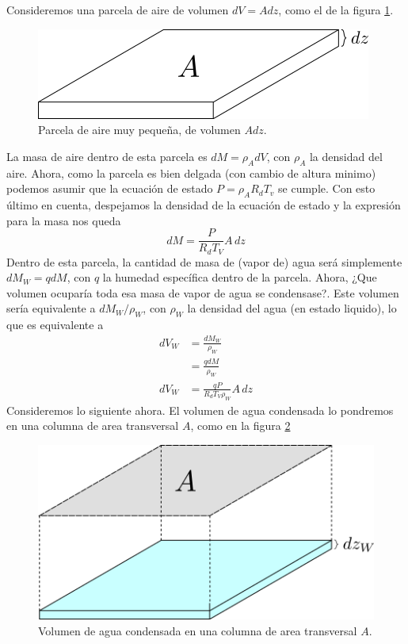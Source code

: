 \documentclass[class=article, crop=false]{standalone}
\begin{document}
Consideremos una parcela de aire de volumen $dV=Adz$, como el de la figura \ref{dV}.
\begin{figure}[h]
   \centering
   \vspace{5mm}
   \includegraphics[width=0.5\linewidth]{dV.png}
   \caption{Parcela de aire muy pequeña, de volumen $Adz$.}
   \label{dV}
\end{figure}

La masa de aire dentro de esta parcela es $dM = \rho_A dV$, con $\rho_A$ la densidad del aire. Ahora, como la parcela es bien delgada (con cambio de altura minimo) podemos asumir que la ecuación de estado $P = \rho_A R_d T_v$ se cumple. Con esto último en cuenta, despejamos la densidad de la ecuación de estado y la expresión para la masa nos queda
\begin{equation}
    dM = \frac{P}{R_dT_V}A\,dz \label{dM}
\end{equation}
Dentro de esta parcela, la cantidad de masa de (vapor de) agua será simplemente $dM_W = qdM$, con $q$ la humedad específica dentro de la parcela. Ahora, ¿Que volumen ocuparía toda esa masa de vapor de agua se condensase?. Este volumen sería equivalente a $dM_W/\rho_W$, con $\rho_W$ la densidad del agua (en estado liquido), lo que es equivalente a  
\begin{align*}
    dV_W &= \frac{dM_W}{\rho_W}\\
         &= \frac{qdM}{\rho_W}\\
    dV_W &= \frac{qP}{R_dT_V \rho_W}A\,dz \label{dMW}
\end{align*}
Consideremos lo siguiente ahora. El volumen de agua condensada lo pondremos en una columna de area transversal $A$, como en la figura \ref{dVW}
\begin{figure}[h]
    \centering
    \vspace{3mm}
    \includegraphics[width=0.52\linewidth]{dVW.png}
    \caption{Volumen de agua condensada en una columna de area transversal $A$.}
    \label{dVW}
\end{figure}
\end{document}
